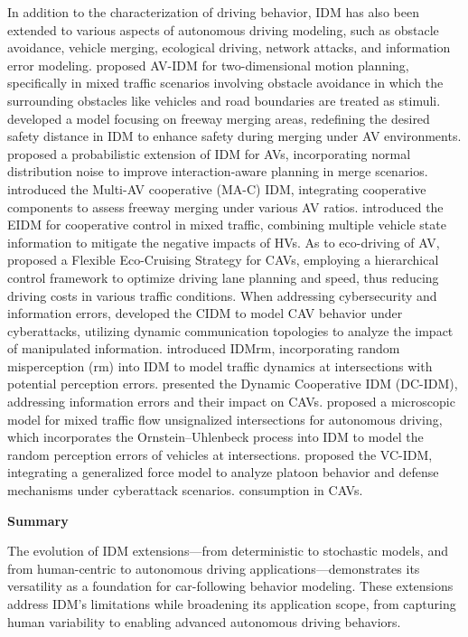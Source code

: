 \documentclass[a4paper,fleqn,11pt]{reviewresponse}
\renewenvironment{quotation}
  {\begingroup\color{customblue}%
   \captionsetup{labelfont={bf},textfont={color=customblue},font={color=customblue}}%
   \list{}{\leftmargin=0em \rightmargin=0em} %
   \item\relax\small}
  {\endlist\endgroup}
\begin{document}
\begin{quotation}
In addition to the characterization of driving behavior, IDM has also been extended to various aspects of autonomous driving modeling, such as obstacle avoidance, vehicle merging, ecological driving, network attacks, and information error modeling. \cite{sharath_enhanced_2020} proposed AV-IDM for two-dimensional motion planning, specifically in mixed traffic scenarios involving obstacle avoidance in which the surrounding obstacles like vehicles and road boundaries are treated as stimuli. \cite{chen_safety_2024} developed a model focusing on freeway merging areas, redefining the desired safety distance in IDM to enhance safety during merging under AV environments. \cite{ward_probabilistic_2017} proposed a probabilistic extension of IDM for AVs, incorporating normal distribution noise to improve interaction-aware planning in merge scenarios. \cite{zhou_impact_2017} introduced the Multi-AV cooperative (MA-C) IDM, integrating cooperative components to assess freeway merging under various AV ratios. \cite{zhou_cooperative_2023} introduced the EIDM for cooperative control in mixed traffic, combining multiple vehicle state information to mitigate the negative impacts of HVs. As to eco-driving of AV, \cite{dongFlexibleEcoCruisingStrategyConnected2024a} proposed a Flexible Eco-Cruising Strategy  for CAVs, employing a hierarchical control framework to optimize driving lane planning and speed, thus reducing driving costs in various traffic conditions. When addressing cybersecurity and information errors,\cite{wang_modeling_2020} developed the CIDM to model CAV behavior under cyberattacks, utilizing dynamic communication topologies to analyze the impact of manipulated information.  \cite{berkhahn_traffic_2022} introduced IDMrm, incorporating random misperception (rm) into IDM to model traffic dynamics at intersections with potential perception errors. \cite{li_unraveling_2024}presented the Dynamic Cooperative IDM (DC-IDM), addressing information errors and their impact on CAVs. \cite{liu_connected_2022} proposed a microscopic model for mixed traffic flow unsignalized intersections for autonomous driving, which incorporates the Ornstein–Uhlenbeck process into IDM to model the random perception errors of vehicles at intersections. \cite{luo_modeling_2024} proposed the VC-IDM, integrating a generalized force model to analyze platoon behavior and defense mechanisms under cyberattack scenarios.
consumption in CAVs.

\textbf{Summary}

The evolution of IDM extensions—from deterministic to stochastic models, and from human-centric to autonomous driving applications—demonstrates its versatility as a foundation for car-following behavior modeling. These extensions address IDM's limitations while broadening its application scope, from capturing human variability to enabling advanced autonomous driving behaviors.

\end{quotation}
\end{document}
